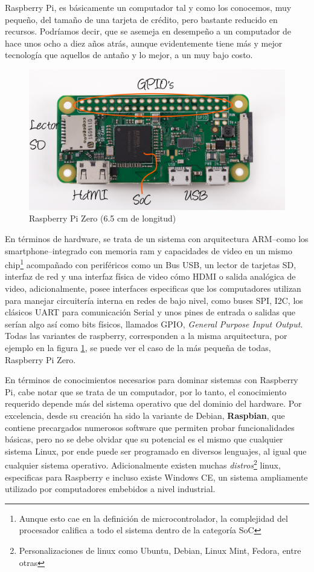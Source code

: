 \documentclass[letterpaper, 10pt]{report}
\begin{document}
	Raspberry Pi, es básicamente un computador tal y como los conocemos, muy pequeño, del tamaño de una tarjeta de crédito, pero bastante reducido en recursos. Podríamos decir, que se asemeja en desempeño a un computador de hace unos ocho a diez años atrás, aunque evidentemente tiene más y mejor tecnología que aquellos de antaño y lo mejor, a un muy bajo costo.
	
\begin{figure}[h]
		\centering
		\includegraphics[scale=0.2]{anatomiaRaspberry.png}
		\caption{Raspberry Pi Zero (6.5 cm de longitud)\label{anatomiaRaspberry}}
\end{figure}
	
	En términos de hardware, se trata de un sistema con arquitectura ARM--como los smartphone--integrado con memoria ram y capacidades de video en un mismo chip\footnote{Aunque esto cae en la definición de microcontrolador, la complejidad del procesador califica a todo el sistema dentro de la categoría SoC} acompañado con periféricos como un Bus USB, un lector de tarjetas SD, interfaz de red y una interfaz física de video cómo HDMI o salida analógica de video, adicionalmente, posee interfaces especificas que los computadores utilizan para manejar circuitería interna en redes de bajo nivel, como buses SPI, I2C, los clásicos UART para comunicación Serial y unos pines de entrada o salidas que serían algo así como bits físicos, llamados GPIO, {\it General Purpose Input Output}. Todas las variantes de raspberry, corresponden a la misma arquitectura, por ejemplo en la figura \ref{anatomiaRaspberry}, se puede ver el caso de la más pequeña de todas, Raspberry Pi Zero.
	
	En términos de conocimientos necesarios para dominar sistemas con Raspberry Pi, cabe notar que se trata de un computador, por lo tanto, el conocimiento requerido depende más del sistema operativo que del dominio del hardware. Por excelencia, desde su creación ha sido la variante de Debian, \textbf{Raspbian}, que contiene precargados numerosos software que permiten probar funcionalidades básicas, pero no se debe olvidar que su potencial es el mismo que cualquier sistema Linux, por ende puede ser programado en diversos lenguajes, al igual que cualquier sistema operativo. Adicionalmente existen muchas \emph{distros}\footnote{Personalizaciones de linux como Ubuntu, Debian, Linux Mint, Fedora, entre otras} linux, especificas para Raspberry e incluso existe Windows CE, un sistema ampliamente utilizado por computadores embebidos a nivel industrial.	
	
\end{document}
